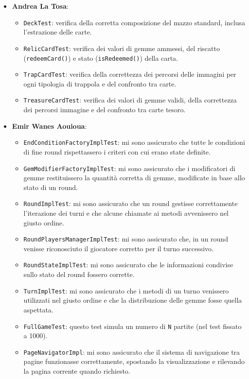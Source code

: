 \documentclass[a4paper,12pt]{report}
\begin{document}
\begin{itemize}
 \item \textbf{Andrea La Tosa}:
	\begin{itemize}
	\item \texttt{DeckTest}: verifica della corretta composizione del mazzo standard, inclusa l’estrazione delle carte.
	\item \texttt{RelicCardTest}: verifica dei valori di gemme ammessi, del riscatto (\texttt{redeemCard()}) e stato (\texttt{isRedeemed()}) della carta.
	\item \texttt{TrapCardTest}: verifica della correttezza dei percorsi delle immagini per ogni tipologia di trappola e del confronto tra carte.
	\item \texttt{TreasureCardTest}: verifica dei valori di gemme validi, della correttezza dei percorsi immagine e del confronto tra carte tesoro.
	\end{itemize}
 \item \textbf{Emir Wanes Aouioua}:
	\begin{itemize}
		\item \texttt{EndConditionFactoryImplTest}: mi sono assicurato che tutte le
			condizioni di fine round rispettassero i criteri con cui erano state definite.
		\item \texttt{GemModifierFactoryImplTest}: mi sono assicurato che i modificatori
			di gemme restituissero la quantità corretta di gemme, modificate in base allo stato di un round.
		\item \texttt{RoundImplTest}: mi sono assicurato che un round gestisse correttamente 
			l'iterazione dei turni e che alcune chiamate ai metodi avvenissero nel giusto ordine.
		\item \texttt{RoundPlayersManagerImplTest}: mi sono assicurato che,
			in un round venisse riconosciuto il giocatore corretto per il turno successivo.
		\item \texttt{RoundStateImplTest}: mi sono assicurato che le informazioni
			condivise sullo stato del round fossero corrette.
		\item \texttt{TurnImplTest}: mi sono assicurato che i metodi di un turno venissero
			utilizzati nel giusto ordine e che la distribuzione delle gemme fosse quella aspettata.
		\item \texttt{FullGameTest}: questo test simula un numero di \texttt{N} partite (nel test fissato a 1000).
		\item \texttt{PageNavigatorImpl}: mi sono assicurato che il sistema di navigazione tra pagine
			funzionasse correttamente, spostando la visualizzazione e rilevando la pagina corrente quando richiesto.

\end{itemize}
\end{itemize}
\end{document}
